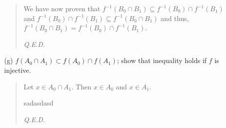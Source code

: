 \documentclass[12pt, a4paper]{article}
\begin{document}
\begin{itemize}
\begin{itemize}
\begin{quote}
We have now proven that $f^{-1}(B_0 \cap B_1) \subseteq f^{-1}(B_0) \cap f^{-1}(B_1)$
and $f^{-1}(B_0) \cap f^{-1}(B_1) \subseteq f^{-1}(B_0 \cap B_1)$ and thus, $f^{-1}(B_0 \cap B_1) = f^{-1}(B_0) \cap f^{-1}(B_1)$.

\begin{flushright}
\textit{Q.E.D.}
\end{flushright}

\end{quote}

\item[(g)]
$f(A_0 \cap A_1) \subset f(A_0) \cap f(A_1)$; show that inequality holds if $f$ is injective.
\vspace{0.25cm}

\begin{quote}
Let $x \in A_0 \cap A_1$. Then $x \in A_0$ and $x \in A_1$.
\vspace{0.5cm}

sadasdasd

\begin{flushright}
\textit{Q.E.D.}
\end{flushright}

\end{quote}

\end{itemize}

\end{itemize}
\end{document}
